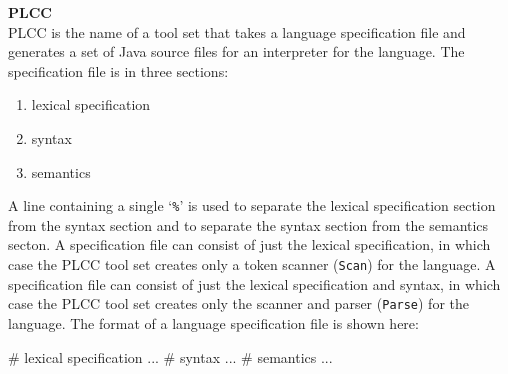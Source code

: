 \begin{minipage}[t]{\sw}
\slidenumber
\LARGE
{\bf PLCC}\\
\Large
PLCC is the name of a tool set
that takes a language specification file
and generates a set of Java source files
for an interpreter for the language.\exx
The specification file is in three sections:
\begin{enumerate}
\parskip -0.5ex
\item lexical specification
\item syntax
\item semantics 
\end{enumerate}
A line containing a single `\verb'%'' is used
to separate the lexical specification section from the syntax section
and to separate the syntax section from the semantics secton.\exx
A specification file can consist
of just the lexical specification,
in which case the PLCC tool set creates only
a token scanner (\verb'Scan') for the language.\exx
A specification file can consist
of just the lexical specification and syntax,
in which case the PLCC tool set creates only
the scanner and parser (\verb'Parse') for the language.\exx
The format of a language specification file 
is shown here:
{\large
\begin{qv}
# lexical specification
...
%
# syntax
...
%
# semantics
...
\end{qv}
}
\end{minipage}
\clearpage
